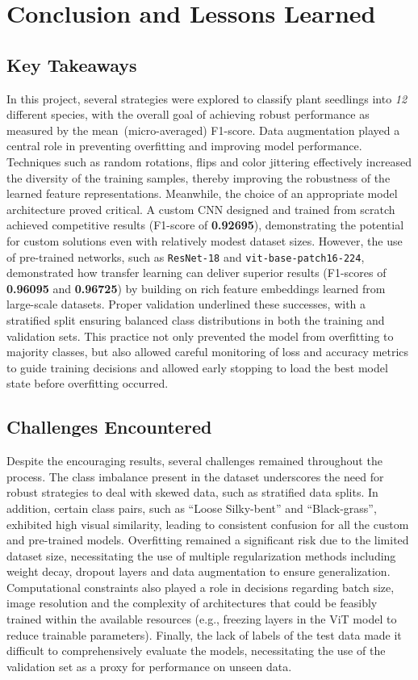\section{Conclusion and Lessons Learned}

\subsection{Key Takeaways}

In this project, several strategies were explored to classify plant seedlings into \textit{12} different species, with the overall goal of achieving robust performance as measured by the mean~(micro-averaged) F1-score. Data augmentation played a central role in preventing overfitting and improving model performance. Techniques such as random rotations, flips and color jittering effectively increased the diversity of the training samples, thereby improving the robustness of the learned feature representations. Meanwhile, the choice of an appropriate model architecture proved critical. A custom CNN designed and trained from scratch achieved competitive results (F1-score of \textbf{0.92695}), demonstrating the potential for custom solutions even with relatively modest dataset sizes. However, the use of pre-trained networks, such as \texttt{ResNet-18} and \texttt{vit-base-patch16-224}, demonstrated how transfer learning can deliver superior results (F1-scores of \textbf{0.96095} and \textbf{0.96725}) by building on rich feature embeddings learned from large-scale datasets. Proper validation underlined these successes, with a stratified split ensuring balanced class distributions in both the training and validation sets. This practice not only prevented the model from overfitting to majority classes, but also allowed careful monitoring of loss and accuracy metrics to guide training decisions and allowed early stopping to load the best model state before overfitting occurred.

\subsection{Challenges Encountered}

Despite the encouraging results, several challenges remained throughout the process. The class imbalance present in the dataset underscores the need for robust strategies to deal with skewed data, such as stratified data splits. In addition, certain class pairs, such as ``Loose Silky-bent'' and ``Black-grass'', exhibited high visual similarity, leading to consistent confusion for all the custom and pre-trained models. Overfitting remained a significant risk due to the limited dataset size, necessitating the use of multiple regularization methods including weight decay, dropout layers and data augmentation to ensure generalization. Computational constraints also played a role in decisions regarding batch size, image resolution and the complexity of architectures that could be feasibly trained within the available resources (e.g., freezing layers in the ViT model to reduce trainable parameters). Finally, the lack of labels of the test data made it difficult to comprehensively evaluate the models, necessitating the use of the validation set as a proxy for performance on unseen data.

